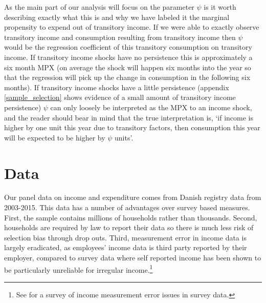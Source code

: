 \documentclass[titlepage]{\econtex}\newcommand{\texname}{ConsumptionHeterogeneity}
\begin{document}
As the main part of our analysis will focus on the parameter $\psi$ is it worth describing exactly what this is and why we have labeled it the marginal propensity to expend out of transitory income. If we were able to exactly observe transitory income and consumption resulting from transitory income then $\psi$ would be the regression coefficient of this transitory consumption on transitory income. If transitory income shocks have no persistence this is approximately a six month MPX (on average the shock will happen six months into the year so that the regression will pick up the change in consumption in the following six months). If transitory income shocks have a little persistence (appendix \ref{sample_selection} shows evidence of a small amount of transitory income persistence) $\psi$ can only loosely be interpreted as the MPX to an income shock, and the reader should bear in mind that the true interpretation is, `if income is higher by one unit this year due to transitory factors, then consumption this year will be expected to be higher by $\psi$ units'.

\section{Data}
Our panel data on income and expenditure comes from Danish registry data from 2003-2015. This data has a number of advantages over survey based measures. First, the sample contains millions of households rather than thousands. Second, households are required by law to report their data so there is much less risk of selection bias through drop outs. Third, measurement error in income data is largely eradicated, as employees' income data is third party reported by their employer, compared to survey data where self reported income has been shown to be particularly unreliable for irregular income.\footnote{See \cite{david_income_nodate} for a survey of income measurement error issues in survey data.}
\end{document}
